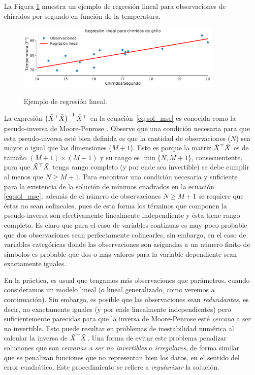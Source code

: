 La Figura \ref{fig:reg_lin_1} muestra un ejemplo de regresión lineal para observaciones de chirridos por segundo en función de la temperatura. 

\begin{figure}[H]
	\centering
	\includegraphics[width=0.9\textwidth]{img/cap1_chirridos.pdf}\\
	\caption{Ejemplo de regresión lineal.}
	\label{fig:reg_lin_1}
\end{figure}

La expresión $\left(\tilde{X}^\top\tilde{X} \right)^{-1} \tilde{X}^\top$ en la ecuación~\eqref{eq:sol_mse} es conocida como la pseudo-inversa de Moore-Penrose \cite[p.~7]{benisrael_greville_2006}. Observe que una condición necesaria para que esta pseudo-inversa esté bien definida es que la cantidad de observaciones ($N$) sea mayor o igual que las dimensiones ($M+1$). Esto es porque la matriz $\tilde{X}^\top\tilde{X}$ es de tamaño $(M+1)\times(M+1)$ y su rango es $\min \{N, M+1\}$, consecuentente, para que $\tilde{X}^\top\tilde{X}$ tenga rango completo (y por ende sea invertible) se debe cumplir al menos que $N\geq M+1$. Para encontrar una condición necesaria y suficiente para la existencia de la solución de mínimos cuadrados en la ecuación \eqref{eq:sol_mse}, además de el número de observaciones $N\geq M+1$ se requiere que éstas no sean colineales, pues de esta forma los términos que componen la pseudo-inversa son efectivamente linealmente independiente y ésta tiene rango completo. Es claro que para el caso de variables continuas es muy poco probable que dos observaciones sean perfectamente colinearles, sin embargo, en el caso de variables categóricas donde las observaciones son asignadas a un número finito de símbolos es probable que dos o más valores para la variable dependiente sean exactamente iguales. 

En la práctica, es usual que tengamos más observaciones que parámetros, cuando consideramos un modelo lineal (o lineal generalizado, como veremos a continuación). Sin embargo, es posible que las observaciones sean \emph{redundantes}, es decir, no exactamente iguales (y por ende linealmente independientes) pero suficientemente parecidas para que la inversa de Moore-Penrose esté \emph{cercana} a ser no invertible. Esto puede resultar en problemas de inestabilidad numérica al  calcular la inversa de $\tilde{X}^\top\tilde{X}$. Una forma de evitar este problema penalizar soluciones que son \emph{cercanas a ser no invertibles} o \emph{irregulares}, de forma similar que se penalizan funciones que no representan bien los datos, en el sentido del error cuadrático. Este procedimiento se refiere a \emph{regularizar} la solución.


